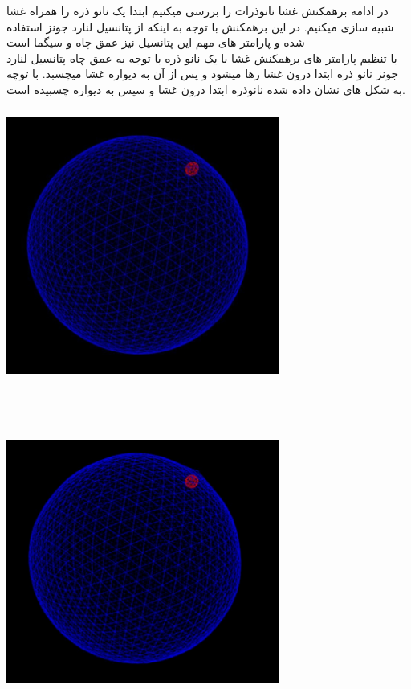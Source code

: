 \documentclass[12pt,onecolumn,a4paper]{report}
\begin{document}
{در ادامه برهمکنش غشا نانوذرات را   بررسی میکنیم
ابتدا یک نانو ذره را همراه غشا شبیه سازی میکنیم.
در این برهمکنش با توجه به اینکه از پتانسیل لنارد جونز استفاده شده و پارامتر های مهم این پتانسیل نیز عمق چاه و سیگما است \\
با تنظیم پارامتر های برهمکنش غشا با یک نانو ذره با توجه به عمق چاه پتانسیل لنارد جونز نانو ذره ابتدا درون غشا رها میشود و پس از آن به دیواره غشا میچسبد.
با توچه به شکل های نشان داده شده نانوذره ابتدا درون غشا و سپس به دیواره چسبیده است.
\begin{center}
\includegraphics[width=9cm, height=9cm]{20210214_160511.jpg}
\end{center}\\
\begin{center}
\includegraphics[width=9cm, height=9cm]{20210214_160439.jpg}
\end{center}\\

}
\end{document}
